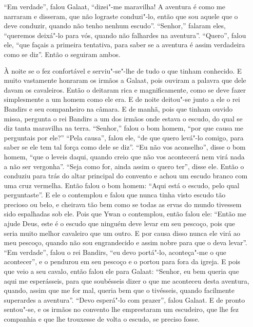 “Em verdade”, falou Galaat, “dizei"-me maravilha! A aventura é como me narraram e
disseram, que não lograste conduzi"-lo, então que sou aquele que o deve
conduzir, quando não tenho nenhum escudo”.  “Senhor,” falaram eles, “queremos
deixá"-lo para vós, quando não falhardes na aventura”. “Quero”, falou ele, “que
façais a primeira tentativa, para saber se a aventura é assim verdadeira como
se diz”. Então o seguiram ambos. 

À noite se o fez confortável e serviu"-se"-lhe de tudo o que tinham conhecido.  E
muito vastamente honraram os irmãos a Galaat, pois ouviram a palavra que dele
davam os cavaleiros. Então o deitaram rica e magnificamente, como se deve fazer
simplesmente a um homem como ele era. E de noite deitou"-se junto a ele
o rei Bandirs e seu companheiro na câmara. E de manhã, pois que tinham ouvido
missa, pergunta o rei Bandirs a um dos irmãos onde estava o escudo, do qual se
diz tanta maravilha na terra. “Senhor,” falou o bom homem, “por que causa me
perguntais por ele?” “Pela causa”, falou ele, “de que quero levá"-lo comigo,
para saber se ele tem tal força como dele se diz”. “Eu não vos aconselho”,
disse o bom homem, “que o leveis daqui, quando creio que não vos acontecerá nem
virá nada a não ser vergonha”. “Seja como for, ainda assim o quero ter”, disse
ele. Então o conduziu para trás do altar principal do convento e achou
um escudo branco com uma cruz vermelha. Então falou o bom homem: “Aqui está o
escudo, pelo qual perguntaste”. E ele o contemplou e falou que nunca tinha
visto escudo tão precioso ou belo, e cheirava tão bem como se todas as ervas do
mundo tivessem sido espalhadas sob ele. Pois que Ywan o contemplou, então falou
ele: “Então me ajude Deus, este é o escudo que ninguém deve levar em seu
pescoço, pois que seria muito melhor cavaleiro que um outro. E por causa disso
nunca ele virá ao meu pescoço, quando não sou engrandecido e assim nobre para
que o deva levar”. “Em verdade”, falou o rei Bandirs, “eu devo
portá"-lo, aconteça"-me o que acontecer”, e o pendurou em seu pescoço e o portou
para fora da igreja. E pois que veio a seu cavalo, então falou ele para Galaat:
“Senhor, eu bem queria que aqui me esperásseis, para que soubésseis dizer o que
me aconteceu desta aventura, quando, assim que me for mal, queria bem que o
tivésseis, quando facilmente superardes a aventura”. “Devo esperá"-lo
com prazer”, falou Galaat. E de pronto sentou"-se, e os irmãos no convento lhe
emprestaram um escudeiro, que lhe fez companhia e que lhe trouxesse de volta o
escudo, se preciso fosse. 

